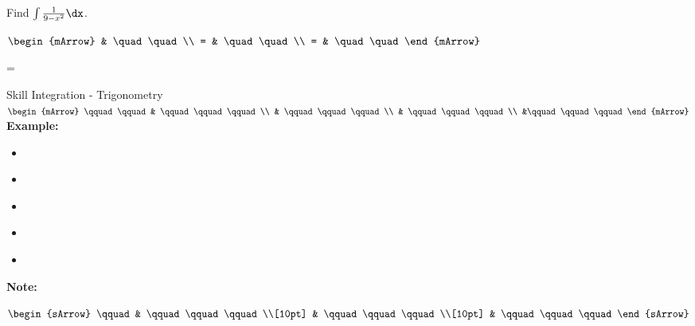 \begin{mtask}
   \task \begin{exercise} Find $\int \frac{1}{9-x^2} \dx$.
           \begin{envSolution}
             $\begin{mArrow}
                   & \quad \quad              \\
		   		 = & \quad \quad              \\
				 = & \quad \quad 
              \end{mArrow}$
            \begin{shortsolution}  
			     =$ \quad \quad \quad \quad$
			\end{shortsolution}				 
           \end{envSolution}
         \end{exercise}

\end{mtask}




\clearpage
{}
\begin{boxSkill}{Skill \thenskill \quad Integration - Trigonometry}
    \noindent%
	 $\begin{mArrow}
        \qquad \qquad &    \qquad\qquad\qquad          \\
                      & \qquad\qquad\qquad \\
			          & \qquad\qquad\qquad  \\
			          &\qquad\qquad\qquad
 	 \end{mArrow}$\\[0.5cm]
	 

	\textbf{Example:}
	\begin{itemize}[leftmargin=0.8cm]
	     \item[] $\qquad\qquad\qquad    $
	     \item[] $\qquad\qquad\qquad     $
	     \item[] $\qquad\qquad\qquad      $ 
	     \item[] $\qquad\qquad\qquad    $
	     \item[] $\qquad\qquad\qquad  $	 
	\end{itemize}
	
	\tcbline
	
    \textbf{Note:}\\[0.6cm]
	\begin{warningEnv}
	    $\begin{sArrow}
	        \qquad   & \qquad\qquad\qquad \\[10pt]
	  	             & \qquad\qquad\qquad                                                                        \\[10pt] 
                     & \qquad\qquad\qquad 				   
		 \end{sArrow}$		   
    \end{warningEnv}
\end{boxSkill}

